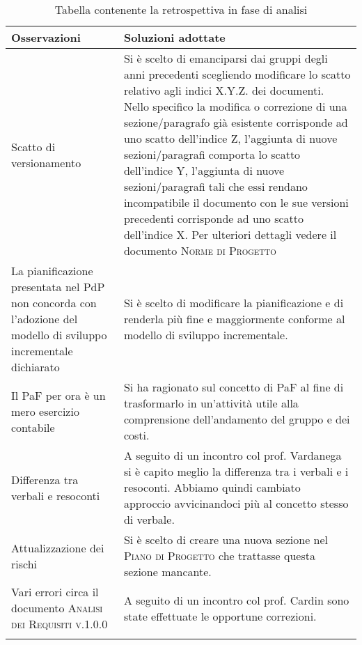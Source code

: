 \documentclass[../piano_di_qualifica.tex]{subfiles}
\begin{document}
\begin{center}
	\begin{longtable}{|p{5cm}|p{10cm}|}
		\hline
		\rowcolor{lightgray}
		\textbf{Osservazioni} & \textbf{Soluzioni adottate}  \\
		\hline
		Scatto di versionamento & 
		Si è scelto di emanciparsi dai gruppi degli anni precedenti scegliendo modificare 
		lo scatto relativo agli indici X.Y.Z. dei documenti. Nello specifico la modifica o correzione di una sezione/paragrafo già esistente
		corrisponde ad uno scatto dell'indice Z, l'aggiunta di nuove sezioni/paragrafi comporta lo scatto dell'indice Y, l'aggiunta di nuove sezioni/paragrafi tali che essi rendano incompatibile il documento con le sue versioni precedenti corrisponde ad uno scatto dell'indice X.
		Per ulteriori dettagli vedere il documento \textsc{Norme di Progetto} \\

		La pianificazione presentata nel PdP non concorda con l’adozione del modello 
		di sviluppo incrementale dichiarato & 
		Si è scelto di modificare la pianificazione e di renderla più fine e maggiormente conforme al modello di 
		sviluppo incrementale. \\

		Il PaF per ora è un mero esercizio contabile &
		Si ha ragionato sul concetto di PaF al fine di trasformarlo in un'attività utile alla comprensione dell'andamento del gruppo e dei costi.\\

		Differenza tra verbali e resoconti &
		A seguito di un incontro col prof. Vardanega si è capito meglio la differenza tra i verbali e i resoconti. Abbiamo quindi cambiato approccio 
		avvicinandoci più al concetto stesso di verbale.\\

		Attualizzazione dei rischi &
		Si è scelto di creare una nuova sezione nel \textsc{Piano di Progetto} che trattasse questa sezione mancante.\\

		Vari errori circa il documento \textsc{Analisi dei Requisiti v.1.0.0} &
		A seguito di un incontro col prof. Cardin sono state effettuate le opportune correzioni.\\

		\hline
		\rowcolor{white}
		\caption{Tabella contenente la retrospettiva in fase di analisi}
	\end{longtable}
\end{center}
\end{document}
